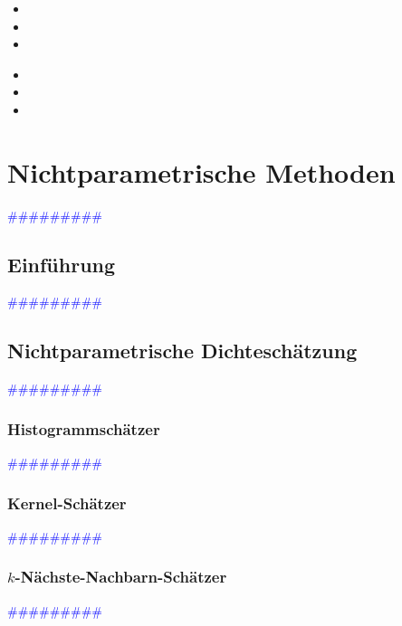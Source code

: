 \documentclass{article}
\begin{document}
      \begin{itemize}
      \color{red}
        \item
        \item
        \item
      \end{itemize}


      \begin{itemize}
      \color{ForestGreen}
        \item
        \item
        \item
      \end{itemize}



\newpage
\section{Nichtparametrische Methoden} %
       \textcolor{blue}{\#\#\#\#\#\#\#\#\#}
  \subsection{Einführung} %
       \textcolor{blue}{\#\#\#\#\#\#\#\#\#}
  \subsection{Nichtparametrische Dichteschätzung} %
       \textcolor{blue}{\#\#\#\#\#\#\#\#\#}
    \subsubsection{Histogrammschätzer} %
       \textcolor{blue}{\#\#\#\#\#\#\#\#\#}
    \subsubsection{Kernel-Schätzer} %
       \textcolor{blue}{\#\#\#\#\#\#\#\#\#}
    \subsubsection{$k$-Nächste-Nachbarn-Schätzer} %
       \textcolor{blue}{\#\#\#\#\#\#\#\#\#}
\end{document}
